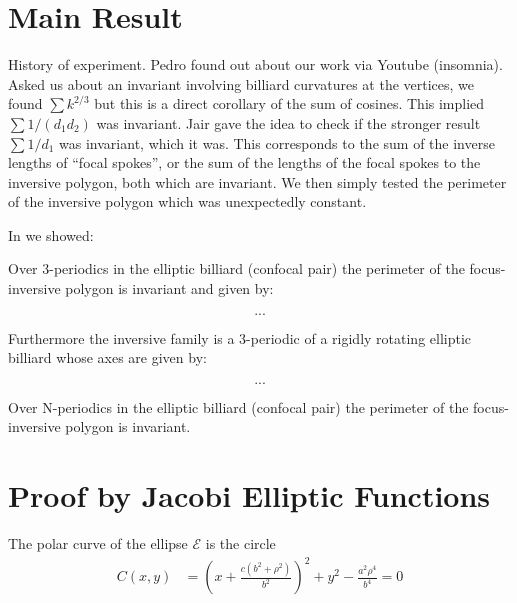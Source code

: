 \section{Main Result}

History of experiment. Pedro found out about our work via Youtube (insomnia). Asked us about an invariant involving billiard curvatures at the vertices, we found $\sum{k^{2/3}}$ but this is a direct corollary of the sum of cosines. This implied $\sum{1/(d_1 d_2)}$ was invariant. Jair gave the idea to check if the stronger result $\sum{1/d_1}$ was invariant, which it was. This corresponds to the sum of the inverse lengths of ``focal spokes'', or the sum of the lengths of the focal spokes to the inversive polygon, both which are invariant. We then simply tested the perimeter of the inversive polygon which was unexpectedly constant.

In \cite{reznik2020-n3-focus-inversive} we showed:

\begin{theorem}
Over 3-periodics in the elliptic billiard (confocal pair) the perimeter of the focus-inversive polygon is invariant and given by:

\[ ... \]

Furthermore the inversive family is a 3-periodic of a rigidly rotating elliptic billiard whose axes are given by:

\[ ... \]


\end{theorem}

\begin{theorem}
Over N-periodics in the elliptic billiard (confocal pair) the perimeter of the focus-inversive polygon is invariant.
\end{theorem}

\section{Proof by Jacobi Elliptic Functions}


\begin{lemma}
The polar curve of the ellipse $\mathcal{E}$ is the circle
\begin{align*}
   C(x,y)&= (x +\frac{c(b^2 + \rho^2)}{b^2})^2+y^2-\frac{a^2\rho^4}{b^4}=0\\
\end{align*}  
\end{lemma}

